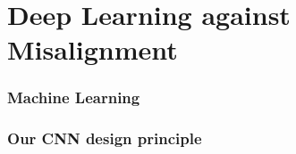 \section{Deep Learning against Misalignment}
\begin{frame}
\frametitle{Machine Learning}

\end{frame}


\begin{frame}
\frametitle{Our CNN design principle}

\end{frame}